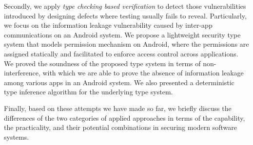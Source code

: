 Secondly, we apply \emph{type checking based verification} to detect those vulnerabilities introduced by designing defects where testing usually fails to reveal. Particularly, we focus on the information leakage vulnerability caused by inter-app communications on an Android system. 
We propose a lightweight security type system that models permission mechanism on Android, where the permissions are assigned statically and facilitated to enforce access control across applications. 
We proved the soundness of the proposed type system in terms of non-interference, with which we are able to prove the absence of information leakage among various apps in an Android system.
We also presented a deterministic type inference algorithm for the underlying type system. 

Finally, based on these attempts we have made so far, we briefly discuss the differences of the two categories of applied approaches in terms of the capability, the practicality, and their potential combinations in securing modern software systems.

